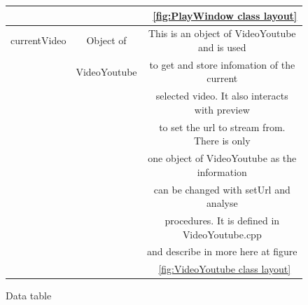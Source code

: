 \documentclass{article}
\begin{document}
\begin{figure}[h]
\begin{center}
\begin{tabular} { | c | c | c |}
                                             &&~\ref{fig:PlayWindow class layout}             \\ \hline
            currentVideo     &   Object of   &This is an object of VideoYoutube and is used   \\
                             &  VideoYoutube &to get and store infomation of the current      \\
                                             &&selected video. It also interacts with preview \\
                                             &&to set the url to stream from. There is only   \\
                                             &&one object of VideoYoutube as the information  \\
                                             &&can be changed with setUrl and analyse         \\
                                             &&procedures. It is defined in VideoYoutube.cpp  \\
                                             &&and describe in more here at figure            \\
                                             &&~\ref{fig:VideoYoutube class layout}           \\ \hline
        \end{tabular}
    \end{center}
    \caption{Data table} \label{fig:dataTable}
\end{figure}

\newpage
\end{document}
